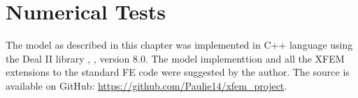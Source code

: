\section{Numerical Tests}
\label{sec:pressure_results}

The model as described in this chapter was implemented in C++ language using the Deal II library \cite{bangerth_deal.ii_2007}, , version 8.0.
The model implementtion and all the XFEM extensions to the standard FE code were suggested by the author.
The source is available on GitHub: \url{https://github.com/Paulie14/xfem_project}.

% 
% 



